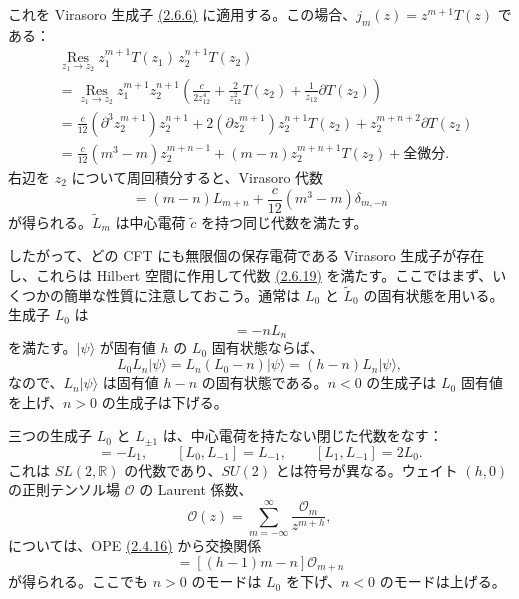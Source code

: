 これを Virasoro 生成子 \hyperref[eq:2.6.6]{(2.6.6)} に適用する。この場合、$j_m(z)=z^{m+1}T(z)$ である：
\begin{equation}
\begin{aligned}
&\operatorname*{Res}_{z_1\to z_2}
z_1^{m+1}T(z_1)\,z_2^{n+1}T(z_2)\\
&=\operatorname*{Res}_{z_1\to z_2}z_1^{m+1}z_2^{n+1}
\left(\frac{c}{2z_{12}^4}+\frac2{z_{12}^2}T(z_2)
+\frac1{z_{12}}\partial T(z_2)\right)\\
&=\frac c{12}(\partial^3z_2^{m+1})z_2^{n+1}
+2(\partial z_2^{m+1})z_2^{n+1}T(z_2)
+z_2^{m+n+2}\partial T(z_2)\\
&=\frac c{12}(m^3-m)z_2^{m+n-1}
+(m-n)z_2^{m+n+1}T(z_2)+\text{全微分}.
\end{aligned}
\tag{2.6.18}\label{eq:2.6.18}
\end{equation}
右辺を $z_2$ について周回積分すると、Virasoro 代数
\begin{equation}
[L_m,L_n]=(m-n)L_{m+n}
+\frac c{12}(m^3-m)\delta_{m,-n}
\tag{2.6.19}\label{eq:2.6.19}
\end{equation}
が得られる。$\widetilde L_m$ は中心電荷 $\widetilde c$ を持つ同じ代数を満たす。

したがって、どの CFT にも無限個の保存電荷である Virasoro 生成子が存在し、これらは Hilbert 空間に作用して代数 \hyperref[eq:2.6.19]{(2.6.19)} を満たす。ここではまず、いくつかの簡単な性質に注意しておこう。通常は $L_0$ と $\widetilde L_0$ の固有状態を用いる。生成子 $L_0$ は
\begin{equation}
[L_0,L_n]=-nL_n
\tag{2.6.20}\label{eq:2.6.20}
\end{equation}
を満たす。$\lvert\psi\rangle$ が固有値 $h$ の $L_0$ 固有状態ならば、
\begin{equation}
L_0L_n\lvert\psi\rangle
=L_n(L_0-n)\lvert\psi\rangle
=(h-n)L_n\lvert\psi\rangle,
\tag{2.6.21}\label{eq:2.6.21}
\end{equation}
なので、$L_n\lvert\psi\rangle$ は固有値 $h-n$ の固有状態である。$n<0$ の生成子は $L_0$ 固有値を上げ、$n>0$ の生成子は下げる。

三つの生成子 $L_0$ と $L_{\pm1}$ は、中心電荷を持たない閉じた代数をなす：
\begin{equation}
[L_0,L_1]=-L_1,\qquad
[L_0,L_{-1}]=L_{-1},\qquad
[L_1,L_{-1}]=2L_0.
\tag{2.6.22}\label{eq:2.6.22}
\end{equation}
これは $SL(2,\mathbb R)$ の代数であり、$SU(2)$ とは符号が異なる。ウェイト $(h,0)$ の正則テンソル場 $\mathcal O$ の Laurent 係数、
\begin{equation}
\mathcal O(z)=\sum_{m=-\infty}^{\infty}\frac{\mathcal O_m}{z^{m+h}},
\tag{2.6.23}\label{eq:2.6.23}
\end{equation}
については、OPE \hyperref[eq:2.4.16]{(2.4.16)} から交換関係
\begin{equation}
[L_m,\mathcal O_n]=[(h-1)m-n]\mathcal O_{m+n}
\tag{2.6.24}\label{eq:2.6.24}
\end{equation}
が得られる。ここでも $n>0$ のモードは $L_0$ を下げ、$n<0$ のモードは上げる。

